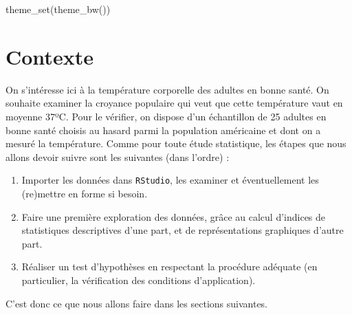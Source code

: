 \documentclass[
  french,
  a4paper,
  DIV=11,
  numbers=noendperiod,
  oneside]{scrreprt}
\newenvironment{Shaded}{}{}
\newcommand{\FunctionTok}[1]{\textcolor[rgb]{0.44,0.26,0.76}{#1}}
\newcommand{\NormalTok}[1]{\textcolor[rgb]{0.14,0.16,0.18}{#1}}
\providecommand{\tightlist}{%
  \setlength{\itemsep}{0pt}\setlength{\parskip}{0pt}}
\begin{document}
\begin{Shaded}
\begin{Highlighting}[]
\FunctionTok{theme\_set}\NormalTok{(}\FunctionTok{theme\_bw}\NormalTok{())}
\end{Highlighting}
\end{Shaded}

\section{Contexte}\label{contexte}

On s'intéresse ici à la température corporelle des adultes en bonne
santé. On souhaite examiner la croyance populaire qui veut que cette
température vaut en moyenne 37ºC. Pour le vérifier, on dispose d'un
échantillon de 25 adultes en bonne santé choisis au hasard parmi la
population américaine et dont on a mesuré la température. Comme pour
toute étude statistique, les étapes que nous allons devoir suivre sont
les suivantes (dans l'ordre) :

\begin{enumerate}
\def\labelenumi{\arabic{enumi}.}
\tightlist
\item
  Importer les données dans \texttt{RStudio}, les examiner et
  éventuellement les (re)mettre en forme si besoin.
\item
  Faire une première exploration des données, grâce au calcul d'indices
  de statistiques descriptives d'une part, et de représentations
  graphiques d'autre part.
\item
  Réaliser un test d'hypothèses en respectant la procédure adéquate (en
  particulier, la vérification des conditions d'application).
\end{enumerate}

C'est donc ce que nous allons faire dans les sections suivantes.
\end{document}
